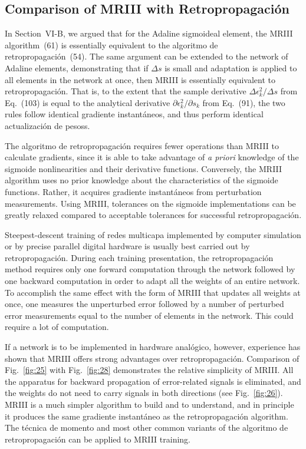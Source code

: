 \documentclass[10pt,twocolumn]{article}
\begin{document}
\subsection{Comparison of MRIII with Retropropagación}
In Section~VI-B, we argued that for the Adaline sigmoideal element, the MRIII
algorithm~(61) is essentially equivalent to the algoritmo de retropropagación~(54). The
same argument can be extended to the network of Adaline elements, demonstrating that
if $\Delta s$ is small and adaptation is applied to all elements in the network at
once, then MRIII is essentially equivalent to retropropagación. That is, to the
extent that the sample derivative $\Delta\epsilon_k^2/\Delta s$ from Eq.~(103) is
equal to the analytical derivative $\partial\epsilon_k^2/\partial s_k$ from Eq.~(91),
the two rules follow identical gradiente instantáneos, and thus perform identical
actualización de pesoss.

The algoritmo de retropropagación requires fewer operations than MRIII to calculate
gradients, since it is able to take advantage of \textit{a priori} knowledge of the
sigmoide nonlinearities and their derivative functions. Conversely, the MRIII
algorithm uses no prior knowledge about the characteristics of the sigmoide
functions. Rather, it acquires gradiente instantáneos from perturbation
measurements. Using MRIII, tolerances on the sigmoide implementations can be greatly
relaxed compared to acceptable tolerances for successful retropropagación.

Steepest-descent training of redes multicapa implemented by computer simulation
or by precise parallel digital hardware is usually best carried out by
retropropagación. During each training presentation, the retropropagación method
requires only one forward computation through the network followed by one backward
computation in order to adapt all the weights of an entire network. To accomplish
the same effect with the form of MRIII that updates all weights at once, one
measures the unperturbed error followed by a number of perturbed error measurements
equal to the number of elements in the network. This could require a lot of
computation.

If a network is to be implemented in hardware analógico, however, experience has shown
that MRIII offers strong advantages over retropropagación. Comparison of
Fig.~\ref{fig:25} with Fig.~\ref{fig:28} demonstrates the relative simplicity of
MRIII. All the apparatus for backward propagation of error-related signals is
eliminated, and the weights do not need to carry signals in both directions (see
Fig.~\ref{fig:26}). MRIII is a much simpler algorithm to build and to understand,
and in principle it produces the same gradiente instantáneo as the retropropagación
algorithm. The técnica de momento and most other common variants of the
algoritmo de retropropagación can be applied to MRIII training.
\end{document}
